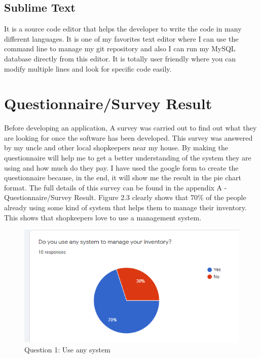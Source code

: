 \subsection{Sublime Text}
It is a source code editor that helps the developer to write the code in many different languages. It is one of my favorites text editor where I can use the command line to manage my git repository and also I can run my MySQL database directly from this editor. It is totally user friendly where you can modify multiple lines and look for specific code easily.

\section{Questionnaire/Survey Result}
Before developing an application, A survey was carried out to find out what they are looking for once the software has been developed. This survey was answered by my uncle and other local shopkeepers near my house. By making the questionnaire will help me to get a better understanding of the system they are using and how much do they pay. I have used the google form to create the questionnaire because, in the end, it will show me the result in the pie chart format. The full details of this survey can be found in the appendix A - Questionnaire/Survey Result.\newline
\newline Figure 2.3 clearly shows that 70\% of the people already using some kind of system that helps them to manage their inventory. This shows that shopkeepers love to use a management system.
\newpage
\begin{figure}[h]
\centering
    \includegraphics[scale=0.7]
    {images/SurveyQue1.png}
    \caption{Question 1: Use any system}
    \label{fig: Question 1: Use any system}
\end{figure}

